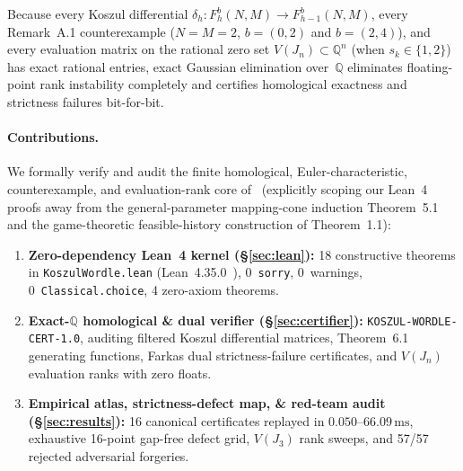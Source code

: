 \documentclass[11pt,twocolumn]{article}
\newcommand{\QQ}{\mathbb{Q}}
\begin{document}
Because every Koszul differential $\delta_h : F_h^b(N, M) \to F_{h-1}^b(N, M)$, every Remark~A.1 counterexample ($N=M=2$, $b=(0,2)$ and $b=(2,4)$), and every evaluation matrix on the rational zero set $V(J_n) \subset \QQ^n$ (when $s_k \in \{1,2\}$) has exact rational entries, exact Gaussian elimination over~$\QQ$ eliminates floating-point rank instability completely and certifies homological exactness and strictness failures bit-for-bit.

\paragraph{Contributions.}
We formally verify and audit the finite homological, Euler-characteristic, counterexample, and evaluation-rank core of~\cite{smithline2026koszul} (explicitly scoping our Lean~4 proofs away from the general-parameter mapping-cone induction Theorem~5.1 and the game-theoretic feasible-history construction of Theorem~1.1):
\begin{enumerate}[leftmargin=*,nosep]
  \item \textbf{Zero-dependency Lean~4 kernel (\S\ref{sec:lean}):} 18 constructive theorems in \texttt{KoszulWordle.lean} (Lean~4.35.0~\cite{demoura2021lean4}), 0~\texttt{sorry}, 0~warnings, 0~\texttt{Classical.choice}, 4 zero-axiom theorems.
  \item \textbf{Exact-$\QQ$ homological \& dual verifier (\S\ref{sec:certifier}):} \texttt{KOSZUL-WORDLE-CERT-1.0}, auditing filtered Koszul differential matrices, Theorem~6.1 generating functions, Farkas dual strictness-failure certificates, and $V(J_n)$ evaluation ranks with zero floats.
  \item \textbf{Empirical atlas, strictness-defect map, \& red-team audit (\S\ref{sec:results}):} 16 canonical certificates replayed in $0.050$--$66.09\,\mathrm{ms}$, exhaustive 16-point gap-free defect grid, $V(J_3)$ rank sweeps, and 57/57 rejected adversarial forgeries.
\end{enumerate}
\end{document}
